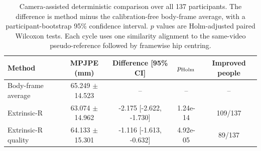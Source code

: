 \begin{table}[t]
\caption{Camera-assisted deterministic comparison over all 137 participants.
The difference is method minus the calibration-free body-frame average, with a
participant-bootstrap 95\% confidence interval. $p$ values are Holm-adjusted
paired Wilcoxon tests. Each cycle uses one similarity alignment to the
same-video pseudo-reference followed by framewise hip centring.}
\label{tab:extrinsic-comparison}
\centering
\scriptsize
\setlength{\tabcolsep}{3pt}
\begin{tabular}{lcccc}
\toprule
Method & MPJPE (mm) & Difference [95\% CI] & $p_{\rm Holm}$ & Improved people \\
\midrule
Body-frame average & 65.249 $\pm$ 14.523 & -- & -- & -- \\
Extrinsic-R & 63.074 $\pm$ 14.962 & -2.175 [-2.622, -1.730] & 1.24e-14 & 109/137 \\
Extrinsic-R quality & 64.133 $\pm$ 15.301 & -1.116 [-1.613, -0.632] & 4.92e-05 & 89/137 \\
\bottomrule
\end{tabular}
\end{table}
